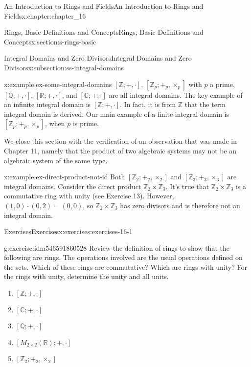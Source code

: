 \documentclass[oneside,10pt,]{book}
\numberwithin{equation}{section}
\begin{document}
\begin{chapterptx}{An Introduction to Rings and Fields}{}{An Introduction to Rings and Fields}{}{}{x:chapter:chapter_16}
\begin{sectionptx}{Rings, Basic Definitions and Concepts}{}{Rings, Basic Definitions and Concepts}{}{}{x:section:s-rings-basic}
\begin{subsectionptx}{Integral Domains and Zero Divisors}{}{Integral Domains and Zero Divisors}{}{}{x:subsection:ss-integral-domains}
\begin{example}{}{x:example:ex-some-integral-domains}
\([\mathbb{Z}; +, \cdot]\), \(\left[\mathbb{Z}_p; +_p , \times_p \right]\) with \(p\) a prime, \([\mathbb{Q}; +, \cdot ]\), \([\mathbb{R}; +, \cdot ]\), and \([\mathbb{C}; +, \cdot ]\) are all integral domains. The key example of an infinite integral domain is \([\mathbb{Z}; +, \cdot ]\). In fact, it is from \(\mathbb{Z}\) that the term integral domain is derived. Our main example of a finite integral domain is \(\left[\mathbb{Z}_p; +_p , \times_p \right]\), when \(p\) is prime.%
\end{example}
We close this section with the verification of an observation that was made in Chapter 11, namely that the product of two algebraic systems may not be an algebraic system of the same type.%
\begin{example}{}{x:example:ex-direct-product-not-id}%
Both \(\left[\mathbb{Z}_2; +_2 , \times_2 \right]\) and \(\left[\mathbb{Z}_3; +_3 , \times_3 \right]\) are integral domains. Consider the direct product \(\mathbb{Z}_2\times \mathbb{Z}_3\). It's true that  \(\mathbb{Z}_2 \times \mathbb{Z}_3\) is a commutative ring with unity (see Exercise 13).  However, \((1,0)\cdot  (0, 2) = (0, 0)\), so \(\mathbb{Z}_2\times \mathbb{Z}_3\) has zero divisors and is therefore not an integral domain.%
\end{example}
\end{subsectionptx}
%
%
\typeout{************************************************}
\typeout{************************************************}
%
\begin{exercises-subsection}{Exercises}{}{Exercises}{}{}{x:exercises:exercises-16-1}
\begin{divisionexercise}{1}{}{}{g:exercise:idm546591860528}%
Review the definition of rings to show that the following are rings. The operations involved are the usual operations defined on the sets. Which of these rings are commutative? Which are rings with unity? For the rings with unity, determine the unity and all units.%
\begin{enumerate}[label=(\alph*)]
\item{}\([\mathbb{Z};+,\cdot ]\)%
\item{}\([\mathbb{C};+,\cdot ]\)%
\item{}\([\mathbb{Q};+,\cdot ]\)%
\item{}\(\left[M_{2\times 2}(\mathbb{R});+, \cdot \right]\)%
\item{}\(\left[\mathbb{Z}_2;+_2,\times_2\right]\)%
\end{enumerate}
%
\end{divisionexercise}%

\end{exercises-subsection}
\end{sectionptx}
\end{chapterptx}
\end{document}
